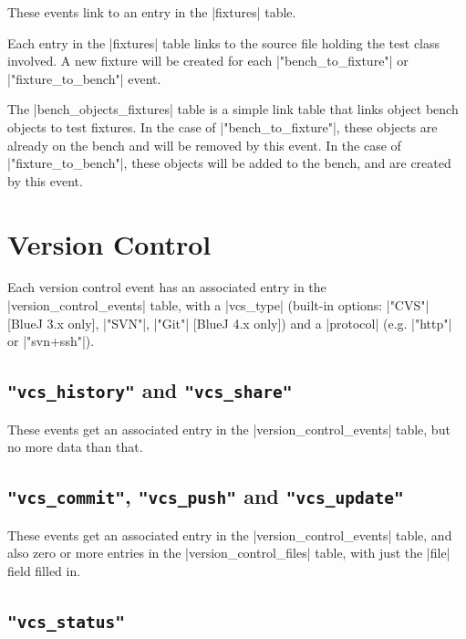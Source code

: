 \documentclass{report}
\begin{document}
These events link to an entry in the |fixtures| table.


Each entry in the |fixtures| table links to the source file holding the test
class involved.  A new fixture will be created for each |"bench_to_fixture"|
or |"fixture_to_bench"| event.


The |bench_objects_fixtures| table is a simple link table that links object
bench objects to test fixtures.  In the case of |"bench_to_fixture"|, these
objects are already on the bench and will be removed by this event.  In the
case of |"fixture_to_bench"|, these objects will be added to the bench, and
are created by this event.

\section{Version Control}



Each version control event has an associated entry in the
|version_control_events| table, with a |vcs_type| (built-in options:
|"CVS"| [BlueJ 3.x only], |"SVN"|, |"Git"| [BlueJ 4.x only]) and a |protocol| (e.g. |"http"| or |"svn+ssh"|).

\subsection{\lstinline!"vcs_history"! and \lstinline!"vcs_share"!}

These events get an associated entry in the |version_control_events|
table, but no more data than that.

\subsection{\lstinline!"vcs_commit"!, \lstinline!"vcs_push"! and \lstinline!"vcs_update"!}

These events get an associated entry in the |version_control_events|
table, and also zero or more entries in the |version_control_files|
table, with just the |file| field filled in.

\subsection{\lstinline!"vcs_status"!}
\end{document}
